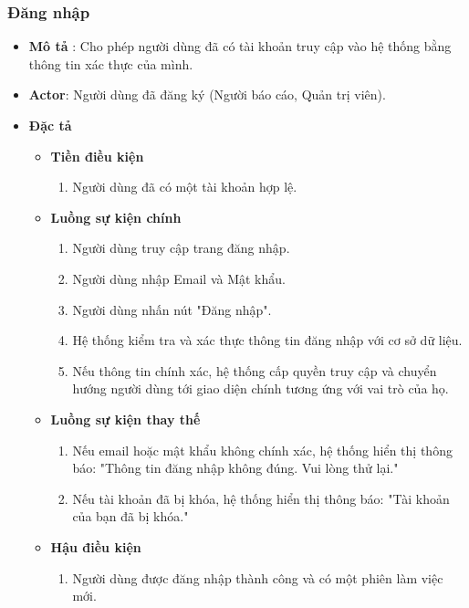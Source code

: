 \documentclass[../DoAn.tex]{subfiles}
\begin{document}
\subsubsection{Đăng nhập}
\begin{itemize}
	\item \textbf{Mô tả} : Cho phép người dùng đã có tài khoản truy cập vào hệ thống bằng thông tin xác thực của mình.
	\item \textbf{Actor}: Người dùng đã đăng ký (Người báo cáo, Quản trị viên).
	\item \textbf{Đặc tả}
	      \begin{itemize}
		      \item \textbf{Tiền điều kiện}
		            \begin{enumerate}
			            \item Người dùng đã có một tài khoản hợp lệ.
		            \end{enumerate}
		      \item \textbf{Luồng sự kiện chính}
		            \begin{enumerate}
			            \item Người dùng truy cập trang đăng nhập.
			            \item Người dùng nhập Email và Mật khẩu.
			            \item Người dùng nhấn nút "Đăng nhập".
			            \item Hệ thống kiểm tra và xác thực thông tin đăng nhập với cơ sở dữ liệu.
			            \item Nếu thông tin chính xác, hệ thống cấp quyền truy cập và chuyển hướng người dùng tới giao diện chính tương ứng với vai trò của họ.
		            \end{enumerate}
		      \item \textbf{Luồng sự kiện thay thế}
		            \begin{enumerate}
			            \item Nếu email hoặc mật khẩu không chính xác, hệ thống hiển thị thông báo: "Thông tin đăng nhập không đúng. Vui lòng thử lại."
			            \item Nếu tài khoản đã bị khóa, hệ thống hiển thị thông báo: "Tài khoản của bạn đã bị khóa."
		            \end{enumerate}
		      \item \textbf{Hậu điều kiện}
		            \begin{enumerate}
			            \item Người dùng được đăng nhập thành công và có một phiên làm việc mới.
		            \end{enumerate}
	      \end{itemize}
\end{itemize}
\end{document}
